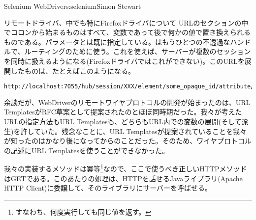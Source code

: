 \begin{aosachapter}{Selenium WebDriver}{s:selenium}{Simon Stewart}
\begin{aosasect1}{リモートドライバ、中でも特にFirefoxドライバについて}
\noindent URLのセクションの中でコロンから始まるものはすべて、変数であって後で何かの値で置き換えられるものである。パラメータとは既に指定している。はもうひとつの不透過なハンドルで、ルーティングのために使う。これを使えば、サーバーが複数のセッションを同時に扱えるようになる(Firefoxドライバではこれができない)。このURLを展開したものは、たとえばこのようになる。

\begin{verbatim}
http://localhost:7055/hub/session/XXX/element/some_opaque_id/attribute/row
\end{verbatim}

余談だが、WebDriverのリモートワイヤプロトコルの開発が始まったのは、URL TemplatesがRFC草案として提案されたのとほぼ同時期だった。我々が考えたURLの指定方法もURL Templatesも、どちらもURL内での変数の展開(そして派生)を許していた。残念なことに、URL Templatesが提案されていることを我々が知ったのはかなり後になってからのことだった。そのため、ワイヤプロトコルの記述にURL Templatesを使うことができなかった。

我々の実装するメソッドは冪等\footnote{すなわち、何度実行しても同じ値を返す。}なので、ここで使うべき正しいHTTPメソッドはGETである。このあたりの処理は、HTTPを話せるJavaライブラリ(Apache HTTP Client)に委譲して、そのライブラリにサーバーを呼ばせる。



\end{aosasect1}
\end{aosachapter}
